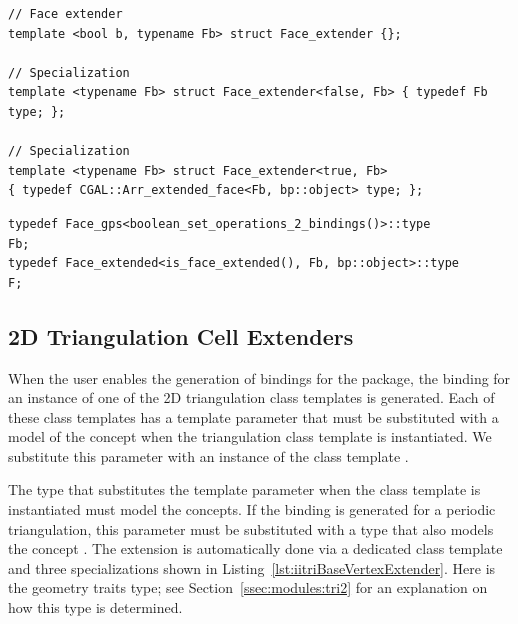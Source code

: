 \begin{lstfloat}
  \begin{lstlisting}[style=cppFramedStyle,basicstyle=\normalsize,%
                     label={lst:arrDcelFaceExtender},%
                     caption={2D Arrangement DCEL user extended face type extender.}]
// Face extender
template <bool b, typename Fb> struct Face_extender {};

// Specialization
template <typename Fb> struct Face_extender<false, Fb> { typedef Fb type; };

// Specialization
template <typename Fb> struct Face_extender<true, Fb> 
{ typedef CGAL::Arr_extended_face<Fb, bp::object> type; };
  \end{lstlisting}
\end{lstfloat}

\begin{lstfloat}
  \begin{lstlisting}[style=cppFramedStyle,basicstyle=\normalsize,%
                     label={lst:arrFinalFace},%
                     caption={The final 2D Arrangement DCEL face type definition.}]
typedef Face_gps<boolean_set_operations_2_bindings()>::type             Fb;
typedef Face_extended<is_face_extended(), Fb, bp::object>::type         F;
  \end{lstlisting}
\end{lstfloat}

\subsection{2D Triangulation Cell Extenders}
\label{sec:extenders:iitri}
When the user enables the generation of bindings for the 
\iiDTriangulationsPackage{} package, the binding for an instance of one
of the 2D triangulation class templates is generated. Each of these
class templates has a template parameter that must be substituted with 
a model of the concept  when
the triangulation class template is instantiated. We substitute this
parameter with an instance of the class template 
. 

The type that substitutes the  template parameter when 
the class template  
is instantiated must model the 
concepts. If the binding is generated for a periodic triangulation, this
parameter must be substituted with a type that also models the concept
. The extension is 
automatically done via a dedicated class template and three 
specializations shown in Listing~\ref{lst:iitriBaseVertexExtender}. Here 
 is the geometry traits type; see 
Section~\ref{ssec:modules:tri2} for an explanation on how this type is 
determined.


